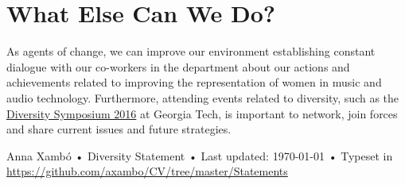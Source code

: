 \documentclass[10pt, a4paper]{article}
\begin{document}
\section*{What Else Can We Do?}

As agents of change, we can improve our environment establishing constant dialogue with our co-workers in the department about our actions and achievements related to improving the representation of women in music and audio technology. Furthermore, attending events related to diversity, such as the \href{http://www.diversity.gatech.edu/diversitysymposium}{Diversity Symposium 2016} at Georgia Tech, is important to network, join forces and share current issues and future strategies. 

\vfill{}

\begin{center}
{\scriptsize  Anna Xambó •\- Diversity Statement •\- Last updated: \today\- •\- %
Typeset in \href{http://nitens.org/taraborelli/cvtex}{
\XeTeX }\\
\href{https://github.com/axambo/CV/tree/master/Statements}{https://github.com/axambo/CV/tree/master/Statements}}
\end{center}
\end{document}
